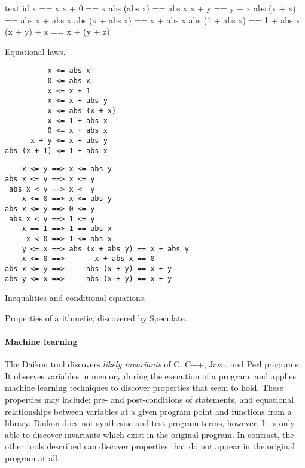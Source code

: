 \begin{listing}
\begin{sublisting}{\textwidth}
\centering
\begin{cminted}{text}
           id x == x
          x + 0 == x
    abs (abs x) == abs x
          x + y == y + x
    abs (x + x) == abs x + abs x
abs (x + abs x) == x + abs x
abs (1 + abs x) == 1 + abs x
    (x + y) + z == x + (y + z)
\end{cminted}
\caption{Equational laws.}\label{lst:arith_props0}
\end{sublisting}

\vspace{2.5em}

\begin{sublisting}{\textwidth}
\begin{minipage}[t]{0.45\textwidth}
\begin{verbatim}
          x <= abs x
          0 <= abs x
          x <= x + 1
          x <= x + abs y
          x <= abs (x + x)
          x <= 1 + abs x
          0 <= x + abs x
      x + y <= x + abs y
abs (x + 1) <= 1 + abs x
\end{verbatim}
\end{minipage}
\begin{minipage}[t]{0.55\textwidth}
\begin{verbatim}
    x <= y ==> x <= abs y
abs x <= y ==> x <= y
 abs x < y ==> x <  y
    x <= 0 ==> x <= abs y
abs x <= y ==> 0 <= y
 abs x < y ==> 1 <= y
    x == 1 ==> 1 == abs x
     x < 0 ==> 1 <= abs x
    y <= x ==> abs (x + abs y) == x + abs y
    x <= 0 ==>       x + abs x == 0
abs x <= y ==>     abs (x + y) == x + y
abs y <= x ==>     abs (x + y) == x + y
\end{verbatim}
\end{minipage}
\caption{Inequalities and conditional equations.}\label{lst:arith_props1}
\end{sublisting}
\caption{Properties of arithmetic, discovered by Speculate.}\label{lst:arith_props}
\end{listing}

\paragraph{Machine learning}
The Daikon\cite{ernst2007} tool discovers \emph{likely invariants} of
C, C++, Java, and Perl programs.  It observes variables in memory
during the execution of a program, and applies machine learning
techniques to discover properties that seem to hold.  These properties
may include: pre- and post-conditions of statements, and equational
relationships between variables at a given program point and functions
from a library.  Daikon does not synthesise and test program terms,
however.  It is only able to discover invariants which exist in the
original program.  In contrast, the other tools described can discover
properties that do not appear in the original program at all.

